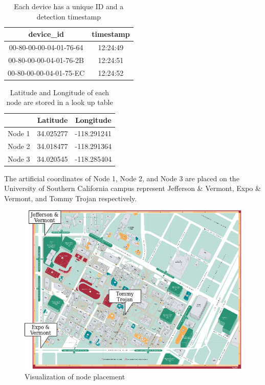 \documentclass[conference]{IEEEtran}
\begin{document}
\begin{table}[htbp]
\caption{Each device has a unique ID and a detection timestamp }
\begin{center}
 \begin{tabular}{||c | c||} 
 \hline
device\_id & timestamp \\ [0.5ex] 
 \hline\hline
 00-80-00-00-04-01-76-64 & 12:24:49 \\ 
 \hline
 00-80-00-00-04-01-76-2B & 12:24:51 \\
 \hline
 00-80-00-00-04-01-75-EC & 12:24:52\\
 \hline
\end{tabular}
\label{tab1}
\end{center}
\end{table}
\begin{table}[htbp]
\caption{Latitude and Longitude of each node are stored in a look up table }
\begin{center}
 \begin{tabular}{||c |c  c||} 
 \hline
&Latitude & Longitude \\ [0.5ex] 
 \hline\hline
Node 1 & 34.025277 & -118.291241 \\ 
 \hline
Node 2 & 34.018477 & -118.291364\\
 \hline
Node 3 & 34.020545 & -118.285404\\
 \hline
\end{tabular}
\label{tab2}
\end{center}
\end{table}

The artificial coordinates of Node 1, Node 2, and Node 3 are placed on the University of Southern California campus represent Jefferson \& Vermont, Expo \& Vermont, and Tommy Trojan respectively.

\begin{figure}[htbp]
\centerline{\includegraphics[width=0.9\columnwidth]{nodes_usc.png}}
\caption{Visualization of node placement}
\label{fig}
\end{figure}
\end{document}
